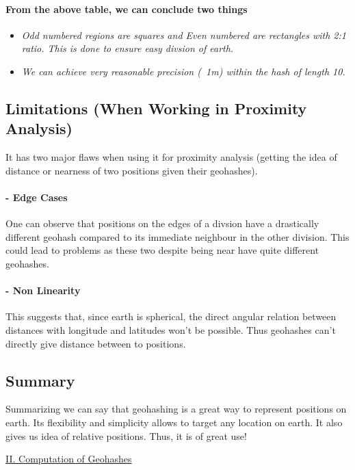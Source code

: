 \documentclass{article}
\begin{document}
\paragraph{From the above table, we can conclude two things}
\begin{itemize}
    \item \emph{Odd numbered regions are squares and Even numbered are rectangles with 2:1 ratio. This is done to ensure easy divsion of earth.}
    \item \emph{We can achieve very reasonable precision (~1m) within the hash of length 10.}
\end{itemize}

\pagebreak

\subsection*{Limitations \small{(When Working in Proximity Analysis)}}
It has two major flaws when using it for proximity analysis (getting the idea of distance or nearness of two positions given their geohashes).
\paragraph{ - Edge Cases} 
     One can observe that positions on the edges of a divsion have a drastically different geohash compared to its immediate neighbour in the other division. This could lead to problems as these two despite being near have quite different geohashes.
\paragraph{ - Non Linearity}
    This suggests that, since earth is spherical, the direct angular relation between distances with longitude and latitudes won't be possible. Thus geohashes can't directly give distance between to positions.

    
\subsection*{Summary}
Summarizing we can say that geohashing is a great way to represent positions on earth. Its flexibility and simplicity allows to target any location on earth. It also gives us idea of relative positions. Thus, it is of great use!

\pagebreak
    
    \begin{center}
    \Large{\underline{II. Computation of Geohashes}}
    \end{center}
\end{document}
